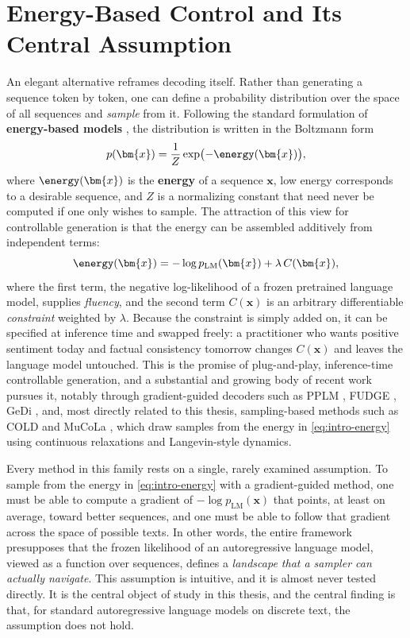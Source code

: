\section{Energy-Based Control and Its Central Assumption}

An elegant alternative reframes decoding itself. Rather than generating a sequence token by token, one can define a probability distribution over the space of all sequences and \emph{sample} from it. Following the standard formulation of \textbf{energy-based models} \citep{lecun2006tutorial, hinton2002training}, the distribution is written in the Boltzmann form
\begin{equation}
    p(\bm{x}) = \frac{1}{Z}\exp\bigl(-\energy(\bm{x})\bigr),
    \label{eq:intro-ebm}
\end{equation}
where $\energy(\bm{x})$ is the \textbf{energy} of a sequence $\bm{x}$, low energy corresponds to a desirable sequence, and $Z$ is a normalizing constant that need never be computed if one only wishes to sample. The attraction of this view for controllable generation is that the energy can be assembled additively from independent terms:
\begin{equation}
    \energy(\bm{x}) = -\log p_{\text{LM}}(\bm{x}) + \lambda\, C(\bm{x}),
    \label{eq:intro-energy}
\end{equation}
where the first term, the negative log-likelihood of a frozen pretrained language model, supplies \emph{fluency}, and the second term $C(\bm{x})$ is an arbitrary differentiable \emph{constraint} weighted by $\lambda$. Because the constraint is simply added on, it can be specified at inference time and swapped freely: a practitioner who wants positive sentiment today and factual consistency tomorrow changes $C(\bm{x})$ and leaves the language model untouched. This is the promise of plug-and-play, inference-time controllable generation, and a substantial and growing body of recent work pursues it, notably through gradient-guided decoders such as PPLM \citep{dathathri2020plug}, FUDGE \citep{yang2021fudge}, GeDi \citep{krause2021gedi}, and, most directly related to this thesis, sampling-based methods such as COLD \citep{qin2022cold} and MuCoLa \citep{kumar2022gradient}, which draw samples from the energy in \eqref{eq:intro-energy} using continuous relaxations and Langevin-style dynamics.

Every method in this family rests on a single, rarely examined assumption. To sample from the energy in \eqref{eq:intro-energy} with a gradient-guided method, one must be able to compute a gradient of $-\log p_{\text{LM}}(\bm{x})$ that points, at least on average, toward better sequences, and one must be able to follow that gradient across the space of possible texts. In other words, the entire framework presupposes that the frozen likelihood of an autoregressive language model, viewed as a function over sequences, defines a \emph{landscape that a sampler can actually navigate}. This assumption is intuitive, and it is almost never tested directly. It is the central object of study in this thesis, and the central finding is that, for standard autoregressive language models on discrete text, the assumption does not hold.

